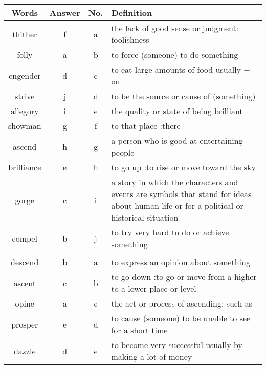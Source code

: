 \documentclass[a4paper]{article}
\begin{document}
\begin{center}
\begin{tabular}{|c|c|c|m{}|}
\hline
Words & Answer & No. & Definition \\
\hline
thither & f & a &  the lack of good sense or judgment: foolishness \\
\hline
folly & a & b &  to force (someone) to do something \\
\hline
engender & d & c &  to eat large amounts of food usually + on \\
\hline
strive & j & d &  to be the source or cause of (something) \\
\hline
allegory & i & e &  the quality or state of being brilliant \\
\hline
showman & g & f &  to that place :there \\
\hline
ascend & h & g &  a person who is good at entertaining people\\
\hline
brilliance & e & h &  to go up :to rise or move toward the sky \\
\hline
gorge & c & i &  a story in which the characters and events are symbols that stand for ideas about human life or for a political or historical situation \\
\hline
compel & b & j &  to try very hard to do or achieve something \\
\hline
 & & & \\
\hline
descend & b & a &  to express an opinion about something \\
\hline
ascent & c & b &  to go down :to go or move from a higher to a lower place or level \\
\hline
opine & a & c &  the act or process of ascending: such as\\
\hline
prosper & e & d &  to cause (someone) to be unable to see for a short time \\
\hline
dazzle & d & e &  to become very successful usually by making a lot of money \\
\hline
\end{tabular}
\end{center}
\end{document}
